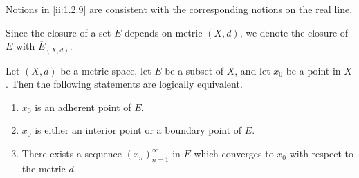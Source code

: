 \begin{note}
  Notions in \cref{ii:1.2.9} are consistent with the corresponding notions on the real line.
\end{note}

\begin{note}
  Since the closure of a set \(E\) depends on metric \((X, d)\), we denote the closure of \(E\) with \(\overline{E}_{(X, d)}\).
\end{note}

\begin{prop}\label{ii:1.2.10}
  Let \((X, d)\) be a metric space, let \(E\) be a subset of \(X\), and let \(x_0\) be a point in \(X\).
  Then the following statements are logically equivalent.
  \begin{enumerate}
    \item \(x_0\) is an adherent point of \(E\).
    \item \(x_0\) is either an interior point or a boundary point of \(E\).
    \item There exists a sequence \((x_n)_{n = 1}^\infty\) in \(E\) which converges to \(x_0\) with respect to the metric \(d\).
  \end{enumerate}
\end{prop}

